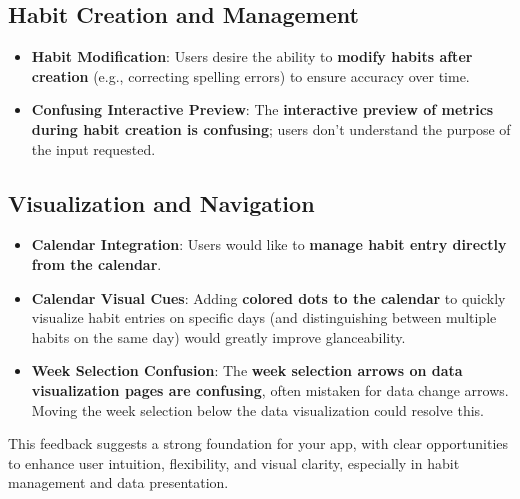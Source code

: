 \documentclass{article}
\begin{document}
\subsection{Habit Creation and Management}

\begin{itemize}
    \item \textbf{Habit Modification}: Users desire the ability to \textbf{modify habits after creation} (e.g., correcting spelling errors) to ensure accuracy over time.
    \item \textbf{Confusing Interactive Preview}: The \textbf{interactive preview of metrics during habit creation is confusing}; users don't understand the purpose of the input requested.
\end{itemize}

\subsection{Visualization and Navigation}

\begin{itemize}
    \item \textbf{Calendar Integration}: Users would like to \textbf{manage habit entry directly from the calendar}.
    \item \textbf{Calendar Visual Cues}: Adding \textbf{colored dots to the calendar} to quickly visualize habit entries on specific days (and distinguishing between multiple habits on the same day) would greatly improve glanceability.
    \item \textbf{Week Selection Confusion}: The \textbf{week selection arrows on data visualization pages are confusing}, often mistaken for data change arrows. Moving the week selection below the data visualization could resolve this.
\end{itemize}


This feedback suggests a strong foundation for your app, with clear opportunities to enhance user intuition, flexibility, and visual clarity, especially in habit management and data presentation.
\end{document}
